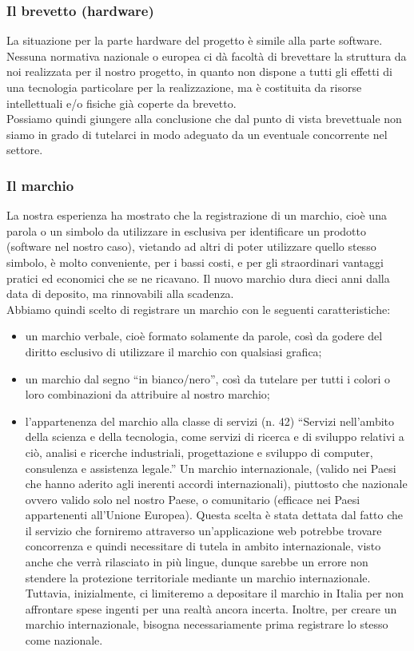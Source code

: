 \subsubsection{Il brevetto (hardware)}
La situazione per la parte hardware del progetto è simile alla parte software.\\
Nessuna normativa nazionale o europea ci dà facoltà di brevettare la struttura da noi realizzata per il nostro progetto, in quanto non dispone a tutti gli effetti di una tecnologia particolare per la realizzazione, ma è costituita da risorse intellettuali e/o fisiche già coperte da brevetto.\\
Possiamo quindi giungere alla conclusione che dal punto di vista brevettuale non siamo in grado di tutelarci in modo adeguato da un eventuale concorrente nel settore.\\

\subsubsection{Il marchio}
La nostra esperienza ha mostrato che la registrazione di un marchio, cioè una parola o un simbolo da utilizzare in esclusiva per identificare un prodotto (software nel nostro caso), vietando ad altri di poter utilizzare quello stesso simbolo, è molto conveniente, per i bassi costi, e per gli straordinari vantaggi pratici ed economici che se ne ricavano. Il nuovo marchio dura dieci anni dalla data di deposito, ma rinnovabili alla scadenza. \\
Abbiamo quindi scelto di registrare un marchio con le seguenti caratteristiche:
\begin{itemize}
\item un marchio verbale, cioè formato solamente da parole, così da godere del diritto esclusivo di utilizzare il marchio con qualsiasi grafica;
\item un marchio dal segno ``in bianco/nero'', così da tutelare per tutti i colori o loro combinazioni da attribuire al nostro marchio;
\item l'appartenenza del marchio alla classe di servizi (n. 42) ``Servizi nell'ambito della scienza e della tecnologia, come servizi di ricerca e di sviluppo relativi a ciò, analisi e ricerche industriali, progettazione e sviluppo di computer, consulenza e assistenza legale.'' Un marchio internazionale, (valido nei Paesi che hanno aderito agli inerenti accordi internazionali), piuttosto che nazionale ovvero valido solo nel nostro Paese, o  comunitario (efficace nei Paesi appartenenti all'Unione Europea). Questa scelta è stata dettata dal fatto che il servizio che forniremo attraverso un'applicazione web potrebbe trovare concorrenza e quindi necessitare di tutela in ambito internazionale, visto anche che verrà rilasciato in più lingue, dunque sarebbe un errore non stendere la protezione territoriale mediante un marchio internazionale. Tuttavia, inizialmente, ci limiteremo a depositare il marchio in Italia per non affrontare spese ingenti per una realtà ancora incerta. Inoltre, per creare un marchio internazionale, bisogna necessariamente prima registrare lo stesso come nazionale.
\end{itemize}

